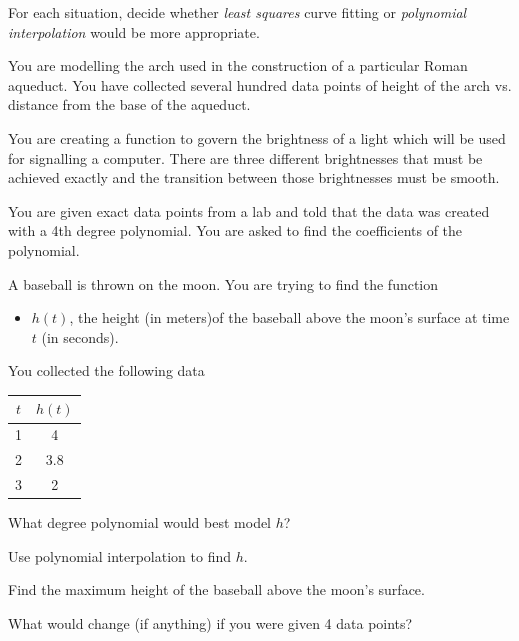 \documentclass{workbook}
\begin{document}
\begin{slide}
	\question
	For each situation, decide whether \emph{least squares} curve fitting
	or \emph{polynomial interpolation} would be more appropriate.

	\begin{parts}
		\item You are modelling the arch used in the construction of a
		particular Roman aqueduct. You have collected several hundred data points
		of height of the arch vs. distance from the base of the aqueduct.

		\item You are creating a function to govern the brightness of a light
		which will be used for signalling a computer. There are three different brightnesses
		that must be achieved exactly and the transition between those brightnesses must be smooth.

		\item You are given exact data points from a lab and told that the data was created with a 4th
		degree polynomial. You are asked to find the coefficients of the polynomial.
	\end{parts}
\end{slide}

\begin{slide}
	\question
	A baseball is thrown on the moon. You are trying to find the function
	\begin{itemize}
		\item $h(t)$, the height (in meters)of the baseball above the moon's surface at time $t$ (in seconds).
	\end{itemize}
	You collected the following data

	\begin{center}
		\begin{tabular}{|c|c|}
			\hline
			$t$ & $h(t)$ \\
			\hline
			1   & 4      \\
			2   & 3.8    \\
			3   & 2      \\
			\hline
		\end{tabular}
	\end{center}

	\begin{parts}
		\item What degree polynomial would best model $h$?
		\item Use polynomial interpolation to find $h$.
		\item Find the maximum height of the baseball above the moon's surface.
		\item What would change (if anything) if you were given 4 data points?
	\end{parts}
\end{slide}
\end{document}

